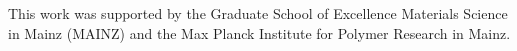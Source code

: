\documentclass[paper=a4,fontsize=12pt,open=right,noabbrev]{nadisser}[2018/07/09]
\begin{document}
This work was supported by the Graduate School of Excellence Materials Science in Mainz (MAINZ) and the Max Planck Institute for Polymer Research in Mainz.
\cleardoublepage


\tableofcontents
{}
\cleardoublepage\quad 
  
\renewcommand{\thepage}{\arabic{page}} 
\setcounter{page}{-1}
\thispagestyle{empty}
  



  

\cleardoublepage 
{}
{} 

\listoffigures 
\cleardoublepage 
{}  
 

%

\cleardoublepage 
{}  
{} 


   

\todos 
\end{document}
